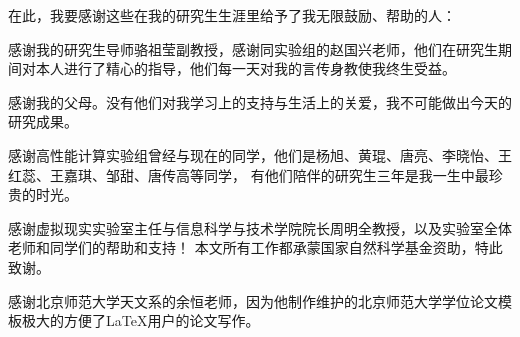 
\begin{ack}
在此，我要感谢这些在我的研究生生涯里给予了我无限鼓励、帮助的人：

感谢我的研究生导师骆祖莹副教授，感谢同实验组的赵国兴老师，他们在研究生期间对本人进行了精心的指导，他们每一天对我的言传身教使我终生受益。

感谢我的父母。没有他们对我学习上的支持与生活上的关爱，我不可能做出今天的研究成果。

感谢高性能计算实验组曾经与现在的同学，他们是杨旭、黄琨、唐亮、李晓怡、王红蕊、王嘉琪、邹甜、唐传高等同学， 有他们陪伴的研究生三年是我一生中最珍贵的时光。

感谢虚拟现实实验室主任与信息科学与技术学院院长周明全教授，以及实验室全体老师和同学们的帮助和支持！ 本文所有工作都承蒙国家自然科学基金资助，特此致谢。

感谢北京师范大学天文系的余恒老师，因为他制作维护的北京师范大学学位论文模板极大的方便了\LaTeX{}用户的论文写作。

\end{ack}
